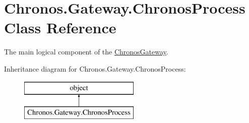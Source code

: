 \hypertarget{classChronos_1_1Gateway_1_1ChronosProcess}{}\section{Chronos.\+Gateway.\+Chronos\+Process Class Reference}
\label{classChronos_1_1Gateway_1_1ChronosProcess}


The main logical component of the \hyperlink{classChronos_1_1Gateway_1_1ChronosGateway}{Chronos\+Gateway}.  


Inheritance diagram for Chronos.\+Gateway.\+Chronos\+Process\+:\begin{figure}[H]
\begin{center}
\leavevmode
\includegraphics[height=2.000000cm]{classChronos_1_1Gateway_1_1ChronosProcess}
\end{center}
\end{figure}
